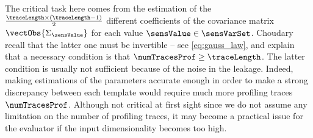 The critical task here comes from the estimation of the \(\frac{\traceLength \times (\traceLength-1)}{2}\) different coefficients of the covariance matrix \(\vectObs{\Sigma_\sensValue}\) for each value \(\sensValue \in \sensVarSet\).
Choudary \etal{} recall that the latter one must be invertible -- see \autoref{eq:gauss_law}, and explain that a necessary condition is that \(\numTracesProf \geq \traceLength\).
The latter condition is usually not sufficient because of the noise in the leakage.
Indeed, making estimations of the parameters accurate enough in order to make a strong discrepancy between each template would require much more profiling traces \(\numTracesProf\).
Although not critical at first sight since we do not assume any limitation on the number of profiling traces, it may become a practical issue for the evaluator if the input dimensionality becomes too high.

